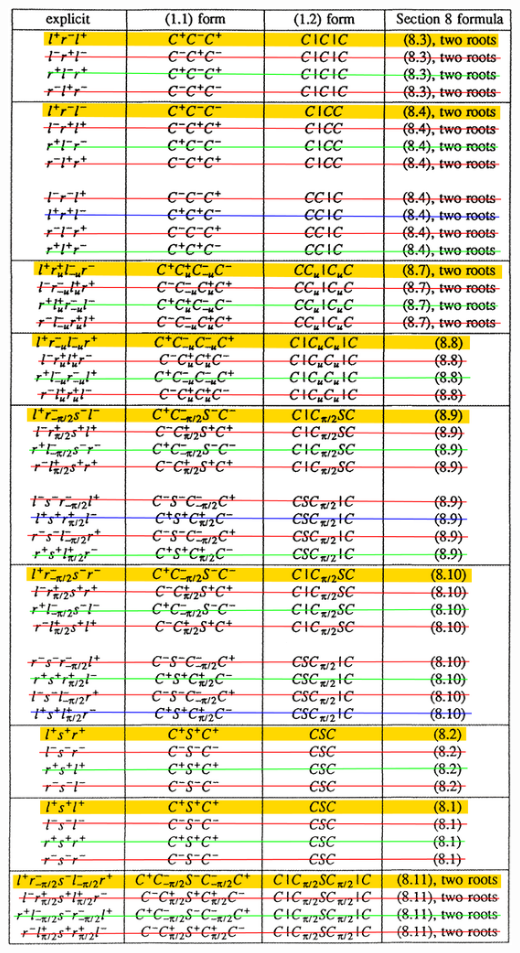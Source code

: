 \documentclass[11pt,a4paper]{article}
\begin{document}
	\begin{minipage}{0.2\textwidth}
	\includegraphics[width=0.84\linewidth]{Illustrations/ReedsSheppPossibilitiesNoTitleNoTimeflipNoReflectNoReverseSummary.png}
	\end{minipage}\\
	
\end{document}
